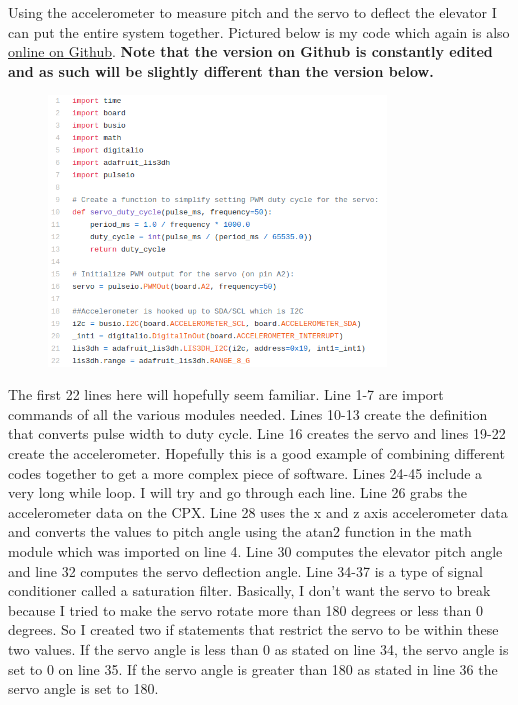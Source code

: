 Using the accelerometer to measure pitch and the servo to deflect the elevator I can put the entire system together. Pictured below is my code which again is also \href{https://github.com/cmontalvo251/Microcontrollers/blob/master/Circuit_Playground/CircuitPython/Servo/feedback_control_servo.py}{online on Github}. {\bf Note that the version on Github is constantly edited and as such will be slightly different than the version below.}
\begin{figure}[H]
  \begin{center}
    \includegraphics[width=0.8\textwidth]{Figures/feedback1.png}
  \end{center}
\end{figure}
The first 22 lines here will hopefully seem familiar. Line 1-7 are import commands of all the various modules needed. Lines 10-13 create the definition that converts pulse width to duty cycle. Line 16 creates the servo and lines 19-22 create the accelerometer. Hopefully this is a good example of combining different codes together to get a more complex piece of software. Lines 24-45 include a very long while loop. I will try and go through each line. Line 26 grabs the accelerometer data on the CPX. Line 28 uses the x and z axis accelerometer data and converts the values to pitch angle using the atan2 function in the math module which was imported on line 4. Line 30 computes the elevator pitch angle and line 32 computes the servo deflection angle. Line 34-37 is a type of signal conditioner called a saturation filter. Basically, I don’t want the servo to break because I tried to make the servo rotate more than 180 degrees or less than 0 degrees. So I created two if statements that restrict the servo to be within these two values. If the servo angle is less than 0 as stated on line 34, the servo angle is set to 0 on line 35. If the servo angle is greater than 180 as stated in line 36 the servo angle is set to 180.
